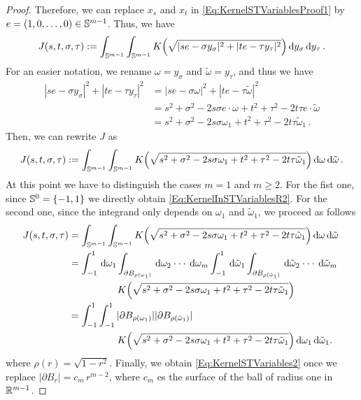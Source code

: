 \begin{proof}
Therefore, we can replace $x_s$ and $x_t$ in \eqref{Eq:KernelSTVariablesProof1} by $e =(1,0,\ldots,
0) \in \mathbb{S}^{m-1}$. Thus, we have
\begin{equation}
\label{Eq:KernelSTVariablesProof2}
J(s,t,\sigma, \tau) := \int_{\mathbb{S}^{m-1}}  \int_{\mathbb{S}^{m-1}} K\Big( \sqrt{|s e - \sigma y_\sigma|^2 + |t e - \tau y_\tau|^2 }\Big) \,\mathrm{d} y_\sigma \,\mathrm{d} y_\tau \,.
\end{equation}
For an easier notation, we rename $\omega = y_\sigma$ and $\tilde\omega = y_\tau$, and thus we have
\begin{align*}
|s e - \sigma y_\sigma|^2 + |t e - \tau y_\tau|^2 &= |s e - \sigma \omega|^2 + |t e - \tau \tilde\omega|^2\\
&= s^2 +\sigma^2 - 2 s \sigma e \cdot \omega + t^2 + \tau^2 - 2 t \tau e\cdot \tilde\omega \\
&= s^2 +\sigma^2 - 2 s \sigma \omega_1 + t^2 + \tau^2 - 2t \tau\tilde\omega_1\,.
\end{align*}
Then, we can rewrite $J$ as
\begin{equation*}
\label{Eq:KernelSTVariablesProof3}
J(s,t,\sigma, \tau) := \int_{\mathbb{S}^{m-1}}  \int_{\mathbb{S}^{m-1}} K\Big( \sqrt{s^2+\sigma^2- 2 s \sigma \omega_1 + t^2 + \tau^2 - 2t \tau\tilde\omega_1}\Big) \,\mathrm{d} \omega \,\mathrm{d} \tilde\omega \,.
\end{equation*}
At this point we have to distinguish the cases $m=1$ and $m\geq 2$. For the fist one, since
$\mathbb{S}^{0} = \{-1,1\}$ we directly obtain \eqref{Eq:KernelInSTVariablesR2}. For the second one,
since the integrand only depends on $\omega_1$ and $\tilde\omega_1$, we proceed as follows
\begin{align*}
\label{Eq:KernelSTVariablesProof4}
J(s,t,\sigma, \tau) &= \int_{\mathbb{S}^{m-1}}  \int_{\mathbb{S}^{m-1}} K\Big( \sqrt{s^2+\sigma^2- 2 s \sigma \omega_1 + t^2 + \tau^2 - 2t \tau\tilde\omega_1}\Big) \,\mathrm{d} \omega \,\mathrm{d} \tilde\omega \,\\
&= \int_{-1}^1 \,\mathrm{d} \omega_1 \int_{\partial B_{\rho(\omega_1)}} \,\mathrm{d} \omega_2\cdot\cdot\cdot\,\mathrm{d} \omega_m \int_{-1}^1 \,\mathrm{d} \tilde\omega_1 \int_{\partial B_{\rho(\tilde\omega_1)}} \,\mathrm{d} \tilde\omega_2\cdot\cdot\cdot\,\mathrm{d} \tilde\omega_m  \\
& \quad \quad \quad \quad \quad K\Big( \sqrt{s^2+\sigma^2- 2 s \sigma \omega_1 + t^2 + \tau^2 - 2t \tau\tilde\omega_1}\Big) \, \\
&= \int_{-1}^1 \int_{-1}^1  |\partial B_{\rho(\omega_1)}| |\partial B_{\rho(\tilde\omega_1)}|\,\\
& \quad \quad \quad \quad \quad K\Big( \sqrt{s^2+\sigma^2- 2 s \sigma \omega_1 + t^2 + \tau^2 - 2t \tau\tilde\omega_1}\Big) \,\mathrm{d} \omega_1 \,\mathrm{d} \tilde\omega_1.
\end{align*}
where $\rho(r) = \sqrt{1-r^2}$. Finally, we obtain \eqref{Eq:KernelSTVariables2} once we replace
$|\partial B_{r}|=c_m\,r^{m-2}$, where $c_m$ es the surface of the ball of radius one in
$\mathbb{R}^{m-1}$.
\end{proof}

